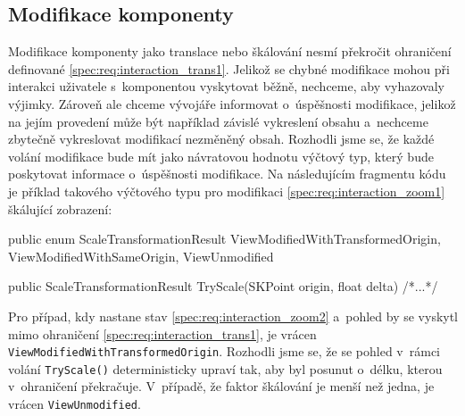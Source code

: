 \subsection{Modifikace komponenty}
\label{kap3:modifikace_komponenty}
Modifikace komponenty jako translace nebo škálování nesmí překročit ohraničení definované \ref{spec:req:interaction_trans1}. Jelikož se chybné modifikace mohou při interakci uživatele s~komponentou vyskytovat běžně, nechceme, aby vyhazovaly výjimky. Zároveň ale chceme vývojáře informovat o~úspěšnosti modifikace, jelikož na jejím provedení může být například závislé vykreslení obsahu a~nechceme zbytečně vykreslovat modifikací nezměněný obsah. Rozhodli jsme se, že každé volání modifikace bude mít jako návratovou hodnotu výčtový typ, který bude poskytovat informace o~úspěšnosti modifikace. Na následujícím fragmentu kódu je příklad takového výčtového typu pro modifikaci \ref{spec:req:interaction_zoom1} škálující zobrazení:

\begin{csharpcode}

public enum ScaleTransformationResult {
    ViewModifiedWithTransformedOrigin,
    ViewModifiedWithSameOrigin,
    ViewUnmodified
}

public ScaleTransformationResult TryScale(SKPoint origin, float delta) {
	/*...*/
}
\end{csharpcode}

Pro případ, kdy nastane stav \ref{spec:req:interaction_zoom2} a~pohled by se vyskytl mimo ohraničení \ref{spec:req:interaction_trans1}, je vrácen \texttt{ViewModifiedWithTransformedOrigin}. Rozhodli jsme se, že se pohled v~rámci volání \texttt{TryScale()} deterministicky upraví tak, aby byl posunut o~délku, kterou v~ohraničení překračuje. V~případě, že faktor škálování je menší než jedna, je vrácen \texttt{ViewUnmodified}.

